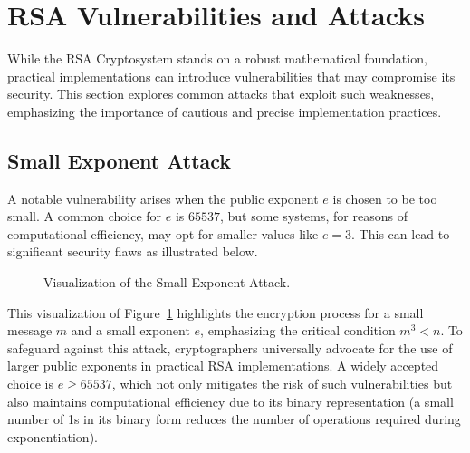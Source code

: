 \documentclass[11pt,a4paper]{article}
\numberwithin{equation}{section}
\begin{document}
\newpage

\section{RSA Vulnerabilities and Attacks}
While the RSA Cryptosystem stands on a robust mathematical foundation, practical implementations can introduce vulnerabilities that may compromise its security. This section explores common attacks that exploit such weaknesses, emphasizing the importance of cautious and precise implementation practices.
\subsection{Small Exponent Attack}
A notable vulnerability arises when the public exponent $e$ is chosen to be too small. A common choice for $e$ is $65537$, but some systems, for reasons of computational efficiency, may opt for smaller values like $e=3$. This can lead to significant security flaws as illustrated below.

\begin{figure}[H]
\centering
{}
\caption{Visualization of the Small Exponent Attack.}
\label{fig:small-exponent-attack}
\end{figure}

This visualization of Figure~\ref{fig:small-exponent-attack}  highlights the encryption process for a small message $m$ and a small exponent $e$, emphasizing the critical condition $m^3 < n$. To safeguard against this attack, cryptographers universally advocate for the use of larger public exponents in practical RSA implementations. A widely accepted choice is $e \geq 65537$, which not only mitigates the risk of such vulnerabilities but also maintains computational efficiency due to its binary representation (a small number of 1s in its binary form reduces the number of operations required during exponentiation).
\end{document}
